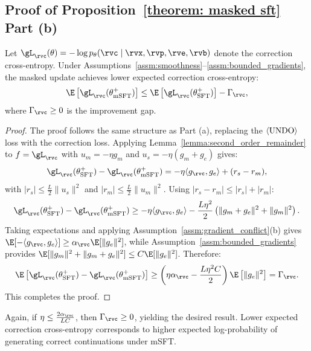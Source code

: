 \subsection{Proof of Proposition~\ref{theorem: masked sft} Part (b)}

\begin{proposition}
Let $\gL_\rvc(\theta) = -\log p_\theta(\rvc \mid \rvx, \rvp, \rve, \rvb)$ denote the correction cross-entropy. Under Assumptions~\ref{assm:smoothness}--\ref{assm:bounded_gradients}, the masked update achieves lower expected correction cross-entropy:
\begin{equation}
    \E\left[\gL_\rvc(\theta_\text{mSFT}^+)\right] \leq \E\left[\gL_\rvc(\theta_\text{SFT}^+)\right] - \Gamma_\rvc,
\end{equation}
where $\Gamma_\rvc \geq 0$ is the improvement gap.
\end{proposition}

\begin{proof}
The proof follows the same structure as Part (a), replacing the $\langle\textnormal{UNDO}\rangle$ loss with the correction loss. 
Applying Lemma~\ref{lemma:second_order_remainder} to $f = \gL_\rvc$ with $u_m = -\eta g_m$ and $u_s = -\eta(g_m + g_e)$ gives:
\begin{equation}
    \gL_\rvc(\theta_\text{SFT}^+) - \gL_\rvc(\theta_\text{mSFT}^+) = -\eta \langle g_\rvc, g_e \rangle + (r_s - r_m),
\end{equation}
with $|r_s| \leq \frac{L}{2}\|u_s\|^2$ and $|r_m| \leq \frac{L}{2}\|u_m\|^2$. Using $|r_s - r_m| \leq |r_s| + |r_m|$:
\begin{equation}
    \gL_\rvc(\theta_\text{SFT}^+) - \gL_\rvc(\theta_\text{mSFT}^+) \geq -\eta \langle g_\rvc, g_e \rangle - \frac{L\eta^2}{2}\left(\|g_m + g_e\|^2 + \|g_m\|^2\right).
\end{equation}
Taking expectations and applying Assumption~\ref{assm:gradient_conflict}(b) gives $\E[-\langle g_\rvc, g_e \rangle] \geq \alpha_\rvc \E[\|g_e\|^2]$, while Assumption~\ref{assm:bounded_gradients} provides $\E[\|g_m\|^2 + \|g_m + g_e\|^2] \leq C \E[\|g_e\|^2]$. Therefore:
\begin{equation}
    \E\left[\gL_\rvc(\theta_\text{SFT}^+) - \gL_\rvc(\theta_\text{mSFT}^+)\right] \geq \left(\eta \alpha_\rvc - \frac{L\eta^2 C}{2}\right) \E\left[\|g_e\|^2\right] = \Gamma_\rvc.
\end{equation}
This completes the proof.
\end{proof}
Again, if $\eta \leq \frac{2\alpha_\rvc}{LC}$, then $\Gamma_\rvc \geq 0$, yielding the desired result. 
Lower expected correction cross-entropy corresponds to higher expected log-probability of generating correct continuations under mSFT.

